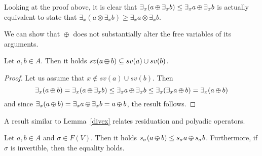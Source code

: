 \documentclass{llncs}
\def\monop{\otimes}
\def\odiv{\, {\ominus\hspace{-7.7pt} \div} \,}
\begin{document}
\begin{remark}
\label{remdiv}
Looking at the proof above, it is clear that $\exists_x(a \odiv \exists_x b) \leq \exists_x a \odiv \exists_x b$
is actually equivalent to state that
$\exists_x(a \monop \exists_x b) \geq \exists_x a \monop \exists_x b$.
\end{remark}

We can show that $\odiv$ does not substantially alter the free variables of its arguments.

\begin{lemma}
Let $a, b \in A$. Then it holds $sv(a \odiv b) \subseteq sv(a) \cup sv(b)$. 
\end{lemma}
\begin{proof}
Let us assume that $x \not \in sv(a) \cup sv(b)$. Then
\[\exists_x(a \odiv b) =  \exists_x(a \odiv \exists_x b) \leq \exists_x a \odiv \exists_x b \leq
  \exists_x(\exists_x a \odiv b) =\exists_x(a \odiv b)\]
 and since $\exists_x(a \odiv b) =  \exists_x a \odiv \exists_x b = a \odiv b$,
 the result follows.
\end{proof}


%

A result similar to Lemma~\ref{divex} relates residuation and polyadic operators.


\begin{lemma}
Let $a, b \in A$ and $\sigma \in F(V)$. Then it holds
$s_\sigma (a \odiv b) \leq s_\sigma a \odiv s_\sigma b$.
Furthermore, if $\sigma$ is invertible, then the equality holds.
\end{lemma}
\end{document}
